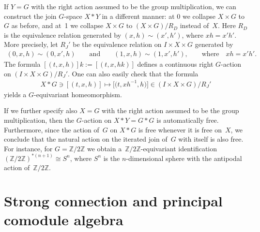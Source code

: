 \documentclass[pdftex]{sigma}
\numberwithin{equation}{section}
\begin{document}
If $Y=G$ with the right action assumed to be the group multiplication,
we can construct the join $G$-space $X * Y$ in a  dif\/ferent manner: at 0 we collapse $X \times G$ to $G$ as
before,
and at~1 we collapse $X \times G$  to $(X\times G)/R_D$ instead of~$X$. Here $R_D$ is the equivalence
relation generated by
$(x,h)\sim (x',h')$, where $xh=x'h'$.
More precisely, let
 $R_J'$ be the  equivalence relation on $I \times X\times G$ generated by
\begin{gather}\label{5}
(0,x,h)\sim (0,x',h)\qquad \text{and}\qquad (1,x,h)\sim (1,x',h'), \qquad \text{where}\quad xh=x'h'.
\end{gather}
The formula $[(t,x,h)]k:=[(t,x,hk)]$ def\/ines a continuous right $G$-action on $(I \times X\times G)/R_J'$.
One can also easily check that the formula{\samepage
\begin{gather}\label{6}
X*G\ni [(t,x,h)] \longmapsto \big[\big(t,xh^{-1},h\big)\big] \in (I\times X\times G)/R_J'
\end{gather}
yields a $G$-equivariant homeomorphism.}

If we further specify also $X=G$ with the right action assumed to be the group multiplication,
  then the $G$-action on $X*Y=G * G$ is automatically free.  Furthermore, since the  action of~$G$ on
 $X*G$ is free whenever it is free on~$X$,
we conclude that the natural action on the iterated join of~$G$ with itself is also free.
For instance, for $G={\mathbb Z}/2{\mathbb Z}$ we obtain a~${\mathbb Z}/2{\mathbb Z}$-equivariant identif\/ication
$({\mathbb Z}/2{\mathbb Z})^{*(n+1)}\cong S^{n}$,
where $S^{n}$ is the $n$-dimensional sphere with the antipodal action of~${\mathbb Z}/2{\mathbb Z}$.


\section{Strong connection and principal comodule algebra}\label{sc}
\end{document}
